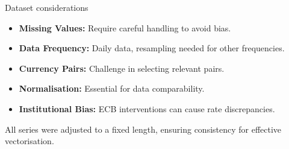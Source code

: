 \documentclass[aspectratio=169, 12pt]{beamer}
\begin{document}
\begin{frame}{Dataset considerations}
    \begin{itemize}
        \item \textbf{Missing Values:} Require careful handling to avoid bias.  
        \item \textbf{Data Frequency:} Daily data, resampling needed for other frequencies.
        \item \textbf{Currency Pairs:} Challenge in selecting relevant pairs.
        \item \textbf{Normalisation:} Essential for data comparability.
        \item \textbf{Institutional Bias:} ECB interventions can cause rate discrepancies.
    \end{itemize}

All series were adjusted to a fixed length, ensuring consistency for effective vectorisation.
\end{frame}
\end{document}
